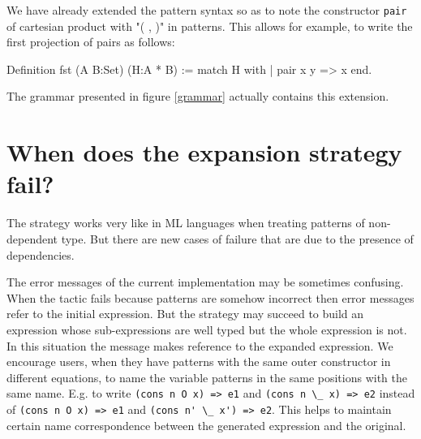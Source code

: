  
We have already extended the pattern syntax so as to note
the constructor \verb+pair+ of cartesian product  with "( , )" in patterns. 
This allows for example, to write the first projection
of pairs as follows:
\begin{coq_example}
Definition fst (A B:Set) (H:A * B) := match H with
                                      | pair x y => x
                                      end.
\end{coq_example}
The grammar presented in figure \ref{grammar} actually
contains this extension. 

\section{When does the expansion strategy fail?}\label{limitations}
The strategy works very like in ML languages when treating
patterns of non-dependent type.  
But there are new cases of failure that are due to the presence of 
dependencies. 

The error messages of the current implementation may be
sometimes confusing.
When the tactic fails because patterns are somehow incorrect  then 
error messages refer to the initial expression. But the strategy
may succeed to build an expression whose sub-expressions are well typed but
the whole expression is not. In this situation  the message makes 
reference to the expanded expression.
We encourage users, when they have patterns with the same outer constructor in different equations, to name the variable patterns in the same positions with the same name.
E.g. to write {\small\verb+(cons n O x) => e1+} and  {\small\verb+(cons n \_ x) => e2+} instead of
{\small\verb+(cons n O x) => e1+} and  {\small\verb+(cons n' \_ x') => e2+}. This helps to maintain certain name correspondence  between the generated expression and the original.


